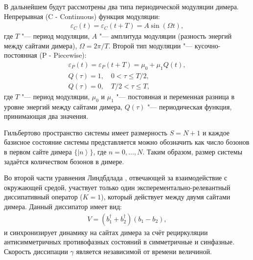 В дальнейшем будут рассмотрены два типа периодической модуляции димера.
Непрерывная (C - Continuous) функция модуляции:
\begin{equation}
	\label{eq:dimer_mod_c}
	\begin{gathered}
		\varepsilon_{C}(t) = \varepsilon_{C}(t + T) = A \sin(\Omega t),
	\end{gathered}
\end{equation}
где \(T\) "--- период модуляции, \(A\) "--- амплитуда модуляции (разность энергий между сайтами димера), \(\Omega = 2 \pi / T\).
Второй тип модуляции "--- кусочно-постоянная (P - Piecewise):
\begin{equation}
	\label{eq:dimer_mod_p}
	\begin{gathered}
		\varepsilon_{P}(t) = \varepsilon_{P}(t + T) = \mu_0 + \mu_1 Q(t), \\
		Q(\tau) = 1, \quad 0 < \tau \le T/2, \\
		Q(\tau) = 0, \quad T/2 < \tau \le T,
	\end{gathered}
\end{equation}
где \(T\) "--- период модуляции, \(\mu_0\) и \(\mu_1\) "--- постоянная и переменная разница в уровне энергий между сайтами димера, \(Q(\tau)\) "--- периодическая функция, принимающая два значения.

Гильбертово пространство системы имеет размерность \(S = N + 1\) и каждое базисное состояние системы представляется можно обозначить как число бозонов в первом сайте димера \( \lbrace \left|n\right>\rbrace\), где \(n = 0,\ldots,N\). Таким образом, размер системы задаётся количеством бозонов в димере.

Во второй части уравнения Линдбдлада , отвечающей за взаимодействие с окружающей средой, участвует только один эксперементально-релевантный \cite{Diehl2008, Kraus2008} диссипативный оператор (\(K=1\)), который действует между двумя сайтами димера. Данный диссипатор имеет вид:
\begin{equation}
	\label{eq:dimer_diss}
	\begin{gathered}
		V = ( b^\dagger_1 + b^\dagger_2) \left( b_1 - b_2 \right),
	\end{gathered}
\end{equation}
и синхронизирует динамику на сайтах димера за счёт рециркуляции антисимметричных противофазных состояний в симметричные и синфазные. Скорость диссипации \(\gamma\) является независимой от времени величиной.


